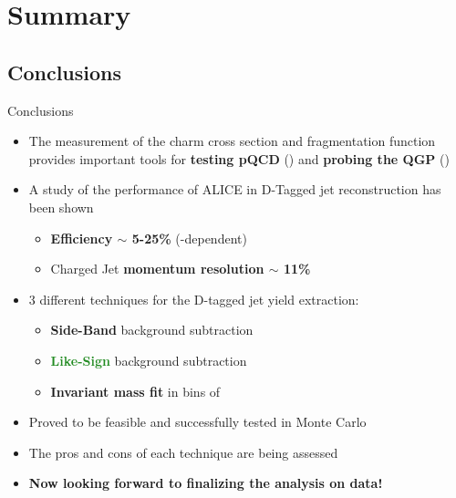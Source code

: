 \documentclass[xcolor={usenames,dvipsnames}]{beamer}
\begin{document}
\section{Summary}
\subsection*{Conclusions}
\begin{frame}{Conclusions}
\begin{itemize}
\item The measurement of the charm cross section and fragmentation function provides important tools for
\textbf{\alert{testing pQCD}} (\pp) and \textbf{\alert{probing the QGP}} (\PbPb)
\item A study of the performance of ALICE in D-Tagged jet reconstruction has been shown
\begin{itemize}
\item \textbf{Efficiency $\sim$ 5-25\%} (\ptd-dependent)
\item Charged Jet \textbf{momentum resolution $\sim$ 11\%}
\end{itemize}
\item 3 different techniques for the D-tagged jet yield extraction:
\begin{itemize}
\item \textbf{\textcolor{BrickRed}{Side-Band}} background subtraction
\item \textbf{\textcolor{ForestGreen}{Like-Sign}} background subtraction
\item \textbf{\textcolor{NavyBlue}{Invariant mass fit}} in bins of \ptchjet
\end{itemize}
\item Proved to be \alert{feasible} and \alert{successfully tested} in Monte Carlo
\item The pros and cons of each technique are being assessed
\item \textbf{\alert{Now looking forward to finalizing the analysis on data!}}
\end{itemize}
\end{frame}
\end{document}
